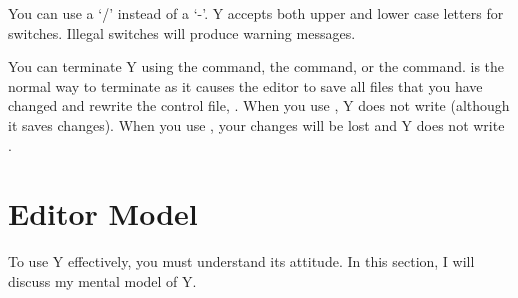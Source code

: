 You can use a `/' instead of a `-'. Y accepts both upper and lower case letters for switches.
Illegal switches will produce warning messages.

You can terminate Y using the  command, the  command, or the
 command.  is the normal way to terminate as it causes the editor to
save all files that you have changed and rewrite the control file, . When
you use , Y does not write  (although it saves changes).
When you use , your changes will be lost and Y does not write
.

\section{Editor Model}

To use Y effectively, you must understand its attitude. In this section, I will discuss my
mental model of Y.

